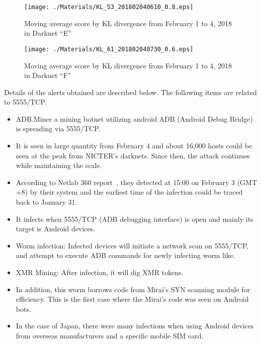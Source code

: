 \documentclass[letterpaper]{sig-alternate-10pt}
\begin{document}
\begin{figure}[htb]
\begin{center}
	\texttt{[image: ./Materials/KL\_53\_201802040610\_0.8.eps]}
	\caption{Moving average score by KL divergence from February 1 to 4, 2018 in Darknet ``E''}
  	\label{fig:KL_5555_53}
	\vspace*{0.5cm}
	\texttt{[image: ./Materials/KL\_61\_201802040730\_0.6.eps]}
	\caption{Moving average score by KL divergence from February 1 to 4, 2018 in Darknet ``F''}
  	\label{fig:KL_5555_61}
\end{center}
\end{figure}

Details of the alerts obtained are described below.
The following items are related to 5555/TCP.
\begin{itemize}
	\item  ADB.Miner a mining botnet utilizing android ADB (Android Debug Bridge) is spreading via 5555/TCP.
	\item It is seen in large quantity from February 4 and about 16,000 hosts could be seen at the peak from NICTER's darknets. Since then, the attack continues while maintaining the scale.
	\item According to Netlab 360 report~\cite{Netlab1}, they detected at 15:00 on February 3 (GMT +8) by their system and the earliest time of the infection could be traced back to January 31.
	\item It infects when 5555/TCP (ADB debugging interface) is open and mainly its target is Android devices.
	\item Worm infection: Infected devices will initiate a network scan on 5555/TCP, and attempt to execute ADB commands for newly infecting worm like.
	\item XMR Mining: After infection, it will dig XMR tokens.
	\item In addition, this worm borrows code from Mirai's SYN scanning module for efficiency. This is the first case where the Mirai's code was seen on Android bots.
	\item In the case of Japan, there were many infections when using Android devices from overseas manufacturers and a specific mobile SIM card.
\end{itemize}
\end{document}
